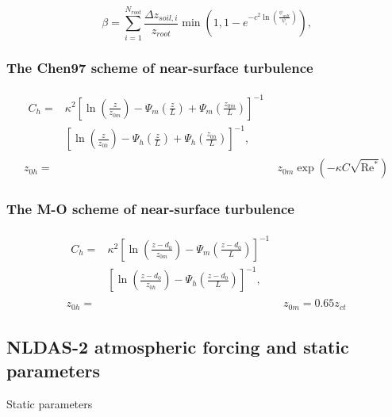 \documentclass[essd]{copernicus}
\begin{document}
\begin{equation}
    \beta = \sum_{i=1}^{N_{root}} \frac{\Delta z_{soil,i}}{z_{root}}
    \min\left(1, 1 - e^{-c^2 \ln\left(\frac{\psi_{wilt}}{\psi_{i}} \right)} \right)
    \text{,}
\end{equation}


\subsubsection{The Chen97 scheme of near-surface turbulence}

\begin{align}
    \begin{split}
        C_h = & \kappa^2 \left[ \ln\left(\frac{z}{z_{0m}}\right)
            - \Psi_{m}\left(\frac{z}{L}\right)
            + \Psi_{m}\left(\frac{z_{0m}}{L}\right) \right]^{-1} \\
        & \left[ \ln\left(\frac{z}{z_{0h}}\right)
            - \Psi_{h}\left(\frac{z}{L}\right)
            + \Psi_{h}\left(\frac{z_{0h}}{L}\right) \right]^{-1} \text{,}
    \end{split}                                      \\
    z_{0h} = & z_{0m} \exp\left(-\kappa C \sqrt{\text{Re}^*}\right)
\end{align}


\subsubsection{The M-O scheme of near-surface turbulence}

\begin{align}
    \begin{split}
        C_h = & \kappa^2 \left[ \ln\left(\frac{z-d_0}{z_{0m}}\right)
            - \Psi_{m}\left(\frac{z-d_0}{L}\right) \right]^{-1} \\
        & \left[ \ln\left(\frac{z-d_0}{z_{0h}}\right)
            - \Psi_{h}\left(\frac{z-d_0}{L}\right) \right]^{-1}
        \text{,}
    \end{split}      \\
    z_{0h} = & z_{0m} = 0.65 z_{ct}
\end{align}


\subsection{NLDAS-2 atmospheric forcing and static parameters} \label{sec:data:nldas}

Static parameters
\end{document}
